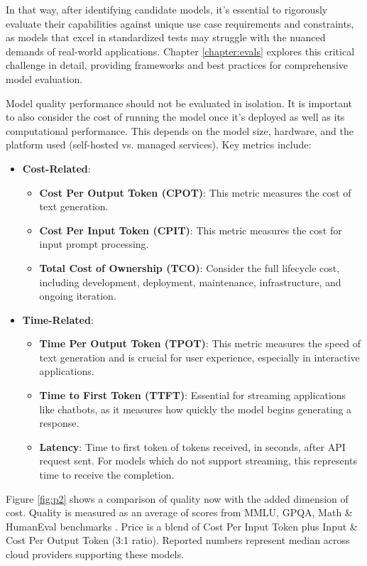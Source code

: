 In that way, after identifying candidate models, it's essential to rigorously evaluate their capabilities against unique use case requirements and constraints, as models that excel in standardized tests may struggle with the nuanced demands of real-world applications. Chapter \ref{chapter:evals} explores this critical challenge in detail, providing frameworks and best practices for comprehensive model evaluation.

Model quality performance should not be evaluated in isolation. It is important to also consider the cost of running the model once it's deployed as well as its computational performance. This depends on the model size, hardware, and the platform used (self-hosted vs. managed services). Key metrics include:

\begin{itemize}
    \item \textbf{Cost-Related}:
    \begin{itemize}
        \item \textbf{Cost Per Output Token (CPOT)}: This metric measures the cost of text generation.
        \item \textbf{Cost Per Input Token (CPIT)}: This metric measures the cost for input prompt processing.
        \item \textbf{Total Cost of Ownership (TCO)}: Consider the full lifecycle cost, including development, deployment, maintenance, infrastructure, and ongoing iteration.
    \end{itemize}
    \item \textbf{Time-Related}:
    \begin{itemize}
        \item \textbf{Time Per Output Token (TPOT)}: This metric measures the speed of text generation and is crucial for user experience, especially in interactive applications.
        \item \textbf{Time to First Token (TTFT)}: Essential for streaming applications like chatbots, as it measures how quickly the model begins generating a response.
        \item \textbf{Latency}: Time to first token of tokens received, in seconds, after API request sent. For models which do not support streaming, this represents time to receive the completion.
    \end{itemize}
\end{itemize}

Figure \ref{fig:p2} shows a comparison of quality now with the added dimension of cost. Quality is measured as an average of scores from MMLU, GPQA, Math \& HumanEval benchmarks . Price is a blend of Cost Per Input Token plus Input \& Cost Per Output Token (3:1 ratio). Reported numbers represent median across cloud providers  supporting these models.

